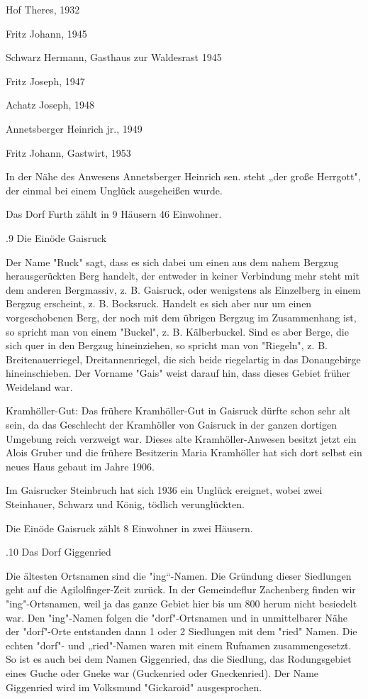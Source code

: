 Hof Theres, 1932

Fritz Johann, 1945

Schwarz Hermann, Gasthaus zur Waldesrast 1945

Fritz Joseph, 1947

Achatz Joseph, 1948

Annetsberger Heinrich jr., 1949

Fritz Johann, Gastwirt, 1953



In der Nähe des Anwesens Annetsberger Heinrich sen. steht „der große Herrgott",
der einmal bei einem Unglück ausgeheißen wurde.

Das Dorf Furth zählt in 9 Häusern 46 Einwohner.

.9 Die Einöde Gaisruck

Der Name "Ruck" sagt, dass es sich dabei um einen aus dem nahem Bergzug
herausgerückten Berg handelt, der entweder in keiner Verbindung mehr steht mit
dem anderen Bergmassiv, z. B. Gaisruck, oder wenigstens als Einzelberg in einem
Bergzug erscheint, z. B. Bocksruck. Handelt es sich aber nur um einen
vorgeschobenen Berg, der noch mit dem übrigen Bergzug im Zusammenhang ist, so
spricht man von einem "Buckel", z. B. Kälberbuckel. Sind es aber Berge, die sich
quer in den Bergzug hineinziehen, so spricht man von "Riegeln", z. B.
Breitenauerriegel, Dreitannenriegel, die sich beide riegelartig in das
Donaugebirge hineinschieben. Der Vorname "Gais" weist darauf hin, dass dieses
Gebiet früher Weideland war.

Kramhöller-Gut: Das frühere Kramhöller-Gut in Gaisruck dürfte schon sehr alt
sein, da das Geschlecht der Kramhöller von Gaisruck in der ganzen dortigen
Umgebung reich verzweigt war. Dieses alte Kramhöller-Anwesen besitzt jetzt ein
Alois Gruber und die frühere Besitzerin Maria Kramhöller hat sich dort selbst
ein neues Haus gebaut im Jahre 1906.

Im Gaisrucker Steinbruch hat sich 1936 ein Unglück ereignet, wobei zwei
Steinhauer, Schwarz und König, tödlich verunglückten.

Die Einöde Gaisruck zählt 8 Einwohner in zwei Häusern.

.10 Das Dorf Giggenried

Die ältesten Ortsnamen sind die "ing“-Namen. Die Gründung dieser Siedlungen geht
auf die Agilolfinger-Zeit zurück. In der Gemeindeflur Zachenberg finden wir
"ing"-Ortsnamen, weil ja das ganze Gebiet hier bis um 800 herum nicht besiedelt
war. Den "ing"-Namen folgen die "dorf"-Ortsnamen und in unmittelbarer Nähe der
"dorf"-Orte entstanden dann 1 oder 2 Siedlungen mit dem "ried" Namen. Die echten
"dorf"- und „ried"-Namen waren mit einem Rufnamen zusammengesetzt. So ist es
auch bei dem Namen Giggenried, das die Siedlung, das Rodungsgebiet eines Guche
oder Gneke war (Guckenried oder Gneckenried). Der Name Giggenried wird im
Volksmund "Gickaroid" ausgesprochen.


